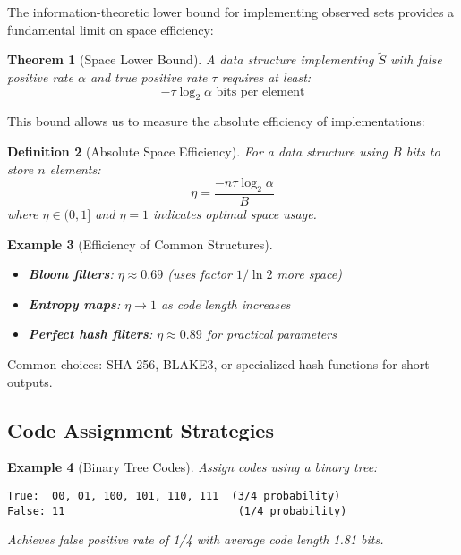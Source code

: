 \documentclass[11pt,final,hidelinks]{article}
\newtheorem{theorem}{Theorem}[section]
\newtheorem{definition}[theorem]{Definition}
\newtheorem{example}[theorem]{Example}
\newcommand{\obs}[1]{\widetilde{#1}}  %
\begin{document}
The information-theoretic lower bound for implementing observed sets provides a fundamental limit on space efficiency:

\begin{theorem}[Space Lower Bound]
A data structure implementing $\obs{S}$ with false positive rate $\alpha$ and true positive rate $\tau$ requires at least:
\begin{equation}
-\tau \log_2 \alpha \text{ bits per element}
\end{equation}
\end{theorem}

This bound allows us to measure the absolute efficiency of implementations:

\begin{definition}[Absolute Space Efficiency]
For a data structure using $B$ bits to store $n$ elements:
\begin{equation}
\eta = \frac{-n\tau \log_2 \alpha}{B}
\end{equation}
where $\eta \in (0, 1]$ and $\eta = 1$ indicates optimal space usage.
\end{definition}

\begin{example}[Efficiency of Common Structures]
\begin{itemize}
    \item \textbf{Bloom filters}: $\eta \approx 0.69$ (uses factor $1/\ln 2$ more space)
    \item \textbf{Entropy maps}: $\eta \to 1$ as code length increases
    \item \textbf{Perfect hash filters}: $\eta \approx 0.89$ for practical parameters
\end{itemize}
\end{example}

Common choices: SHA-256, BLAKE3, or specialized hash functions for short outputs.

\subsection{Code Assignment Strategies}

\begin{example}[Binary Tree Codes]
Assign codes using a binary tree:
\begin{verbatim}
True:  00, 01, 100, 101, 110, 111  (3/4 probability)
False: 11                           (1/4 probability)
\end{verbatim}
Achieves false positive rate of 1/4 with average code length 1.81 bits.
\end{example}
\end{document}
